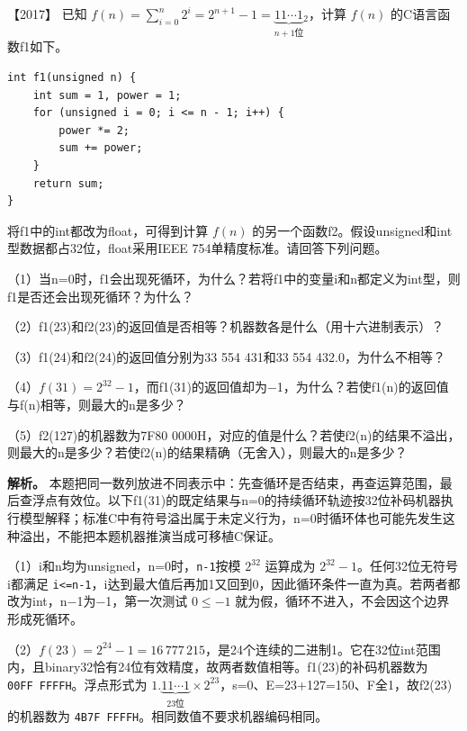 \noindent{}【2017】 已知 \(f(n)=\sum_{i=0}^{n}2^i=2^{n+1}-1=\underbrace{11\cdots1}_{n+1\text{位}}{}_2\)，计算 \(f(n)\) 的C语言函数f1如下。

\par\medskip\noindent
\begin{minipage}{\linewidth}
\begin{verbatim}
int f1(unsigned n) {
    int sum = 1, power = 1;
    for (unsigned i = 0; i <= n - 1; i++) {
        power *= 2;
        sum += power;
    }
    return sum;
}
\end{verbatim}
\end{minipage}\par\medskip

将f1中的int都改为float，可得到计算 \(f(n)\) 的另一个函数f2。假设unsigned和int型数据都占32位，float采用IEEE 754单精度标准。请回答下列问题。

（1）当n=0时，f1会出现死循环，为什么？若将f1中的变量i和n都定义为int型，则f1是否还会出现死循环？为什么？

（2）f1(23)和f2(23)的返回值是否相等？机器数各是什么（用十六进制表示）？

（3）f1(24)和f2(24)的返回值分别为33 554 431和33 554 432.0，为什么不相等？

（4）\(f(31)=2^{32}-1\)，而f1(31)的返回值却为−1，为什么？若使f1(n)的返回值与f(n)相等，则最大的n是多少？

（5）f2(127)的机器数为7F80 0000H，对应的值是什么？若使f2(n)的结果不溢出，则最大的n是多少？若使f2(n)的结果精确（无舍入），则最大的n是多少？


\textbf{解析。} 本题把同一数列放进不同表示中：先查循环是否结束，再查运算范围，最后查浮点有效位。以下f1(31)的既定结果与n=0的持续循环轨迹按32位补码机器执行模型解释；标准C中有符号溢出属于未定义行为，n=0时循环体也可能先发生这种溢出，不能把本题机器推演当成可移植C保证。

（1）i和n均为unsigned，n=0时，\allowbreak{}\texttt{n-1}按模 \(2^{32}\) 运算成为 \(2^{32}-1\)。任何32位无符号i都满足 \allowbreak{}\texttt{i\textless{}=n-1}，i达到最大值后再加1又回到0，因此循环条件一直为真。若两者都改为int，n−1为−1，第一次测试 \(0\le-1\) 就为假，循环不进入，不会因这个边界形成死循环。

（2）\(f(23)=2^{24}-1=16\,777\,215\)，是24个连续的二进制1。它在32位int范围内，且binary32恰有24位有效精度，故两者数值相等。f1(23)的补码机器数为 \allowbreak{}\texttt{00FF\ FFFFH}。浮点形式为 \(1.\underbrace{11\cdots1}_{23\text{位}}\times2^{23}\)，s=0、E=23+127=150、F全1，故f2(23)的机器数为 \allowbreak{}\texttt{4B7F\ FFFFH}。相同数值不要求机器编码相同。

